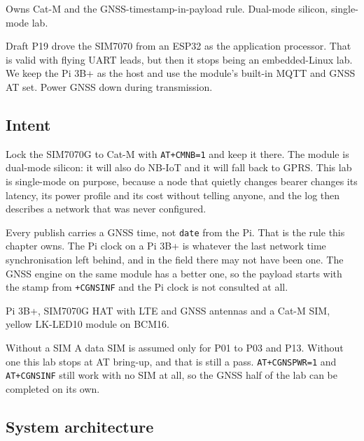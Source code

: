 
\begin{unique}
Owns Cat-M and the GNSS-timestamp-in-payload rule. Dual-mode silicon, single-mode lab.
\end{unique}

\begin{blueprint}
Draft P19 drove the SIM7070 from an ESP32 as the application processor. That is valid with flying UART leads, but then it stops being an embedded-Linux lab. We keep the Pi 3B+ as the host and use the module's built-in MQTT and GNSS AT set. Power GNSS down during transmission.
\end{blueprint}

\subsection*{Intent}

Lock the SIM7070G to Cat-M with \texttt{AT+CMNB=1} and keep it there. The module is dual-mode silicon: it will also do NB-IoT and it will fall back to GPRS. This lab is single-mode on purpose, because a node that quietly changes bearer changes its latency, its power profile and its cost without telling anyone, and the log then describes a network that was never configured.

Every publish carries a GNSS time, not \texttt{date} from the Pi. That is the rule this chapter owns. The Pi clock on a Pi 3B+ is whatever the last network time synchronisation left behind, and in the field there may not have been one. The GNSS engine on the same module has a better one, so the payload starts with the stamp from \texttt{+CGNSINF} and the Pi clock is not consulted at all.

\begin{kit}
Pi 3B+, SIM7070G HAT with LTE and GNSS antennas and a Cat-M SIM, yellow LK-LED10 module on BCM16.
\end{kit}

\begin{note}{Without a SIM}
A data SIM is assumed only for P01 to P03 and P13. Without one this lab stops at AT bring-up, and that is still a pass. \texttt{AT+CGNSPWR=1} and \texttt{AT+CGNSINF} still work with no SIM at all, so the GNSS half of the lab can be completed on its own.
\end{note}

\subsection*{System architecture}

